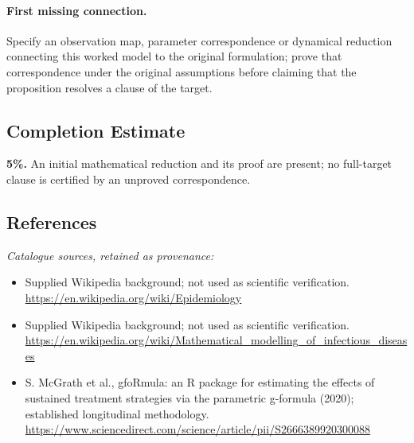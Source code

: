 \documentclass[11pt]{article}
\begin{document}
\paragraph{First missing connection.} Specify an observation map, parameter correspondence or dynamical reduction connecting this worked model to the original formulation; prove that correspondence under the original assumptions before claiming that the proposition resolves a clause of the target.
\subsection{Completion Estimate}
\textbf{5\%.} An initial mathematical reduction and its proof are present; no full-target clause is certified by an unproved correspondence.
\subsection{References}
\noindent\emph{Catalogue sources, retained as provenance:}
\begin{itemize}
\item Supplied Wikipedia background; not used as scientific verification. \url{https://en.wikipedia.org/wiki/Epidemiology}
\item Supplied Wikipedia background; not used as scientific verification. \url{https://en.wikipedia.org/wiki/Mathematical_modelling_of_infectious_diseases}
\item S. McGrath et al., gfoRmula: an R package for estimating the effects of sustained treatment strategies via the parametric g-formula (2020); established longitudinal methodology. \url{https://www.sciencedirect.com/science/article/pii/S2666389920300088}
\end{itemize}
\clearpage


\appendix
\end{document}
